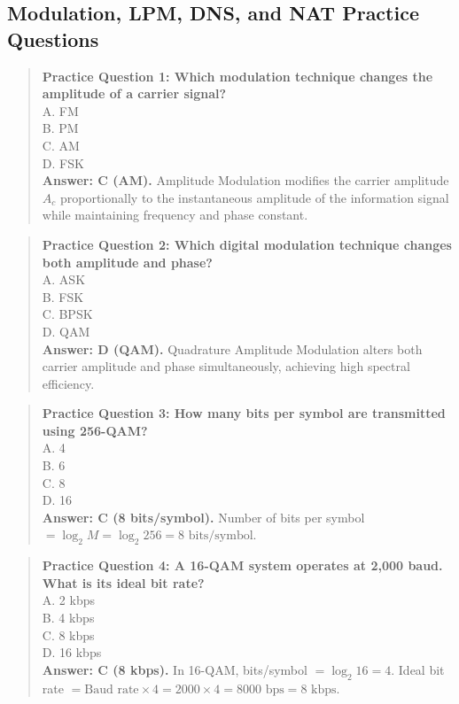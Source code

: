 \subsection{Modulation, LPM, DNS, and NAT Practice Questions}
\begin{quote}
\textbf{Practice Question 1: Which modulation technique changes the amplitude of a carrier signal?}\\[4pt]
\quad A. FM\\[2pt]
\quad B. PM\\[2pt]
\quad C. AM\\[2pt]
\quad D. FSK\\[2pt]
\vspace{4pt}
\textbf{Answer: C (AM).} Amplitude Modulation modifies the carrier amplitude $A_c$ proportionally to the instantaneous amplitude of the information signal while maintaining frequency and phase constant.
\end{quote}
\begin{quote}
\textbf{Practice Question 2: Which digital modulation technique changes both amplitude and phase?}\\[4pt]
\quad A. ASK\\[2pt]
\quad B. FSK\\[2pt]
\quad C. BPSK\\[2pt]
\quad D. QAM\\[2pt]
\vspace{4pt}
\textbf{Answer: D (QAM).} Quadrature Amplitude Modulation alters both carrier amplitude and phase simultaneously, achieving high spectral efficiency.
\end{quote}
\begin{quote}
\textbf{Practice Question 3: How many bits per symbol are transmitted using 256-QAM?}\\[4pt]
\quad A. 4\\[2pt]
\quad B. 6\\[2pt]
\quad C. 8\\[2pt]
\quad D. 16\\[2pt]
\vspace{4pt}
\textbf{Answer: C (8 bits/symbol).} Number of bits per symbol $= \log_2 M = \log_2 256 = 8\text{ bits/symbol}$.
\end{quote}
\begin{quote}
\textbf{Practice Question 4: A 16-QAM system operates at 2,000 baud. What is its ideal bit rate?}\\[4pt]
\quad A. 2 kbps\\[2pt]
\quad B. 4 kbps\\[2pt]
\quad C. 8 kbps\\[2pt]
\quad D. 16 kbps\\[2pt]
\vspace{4pt}
\textbf{Answer: C (8 kbps).} In 16-QAM, bits/symbol $= \log_2 16 = 4$. Ideal bit rate $= \text{Baud rate} \times 4 = 2000 \times 4 = 8000\text{ bps} = 8\text{ kbps}$.
\end{quote}
